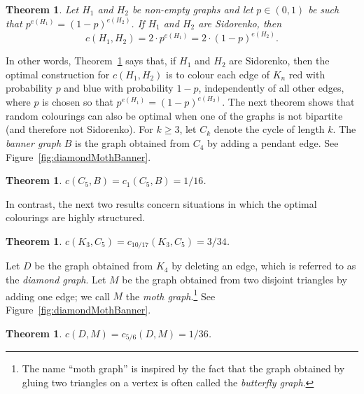 \documentclass[12pt]{article}
\numberwithin{equation}{section}
\newtheorem{thm}[equation]{Theorem}
\theoremstyle{definition}
\theoremstyle{remark}
\begin{document}
\begin{thm}
\label{th:Sidorenko}
Let $H_1$ and $H_2$ be non-empty graphs and let $p\in(0,1)$ be such that $p^{e(H_1)}=(1-p)^{e(H_2)}$. If $H_1$ and $H_2$ are Sidorenko, then
\[c(H_1,H_2)=2\cdot p^{e(H_1)}=2\cdot (1-p)^{e(H_2)}.\]
\end{thm}

In other words, Theorem~\ref{th:Sidorenko} says that, if $H_1$ and $H_2$ are Sidorenko, then the optimal construction for $c(H_1,H_2)$ is to colour each edge of $K_n$ red with probability $p$ and blue with probability $1-p$, independently of all other edges, where $p$ is chosen so that $p^{e(H_1)}=(1-p)^{e(H_2)}$. The next theorem shows that random colourings can also be optimal when one of the graphs is not bipartite (and therefore not Sidorenko). For $k\geq3$, let $C_k$ denote the cycle of length $k$. The \emph{banner graph} $B$ is the graph obtained from $C_4$ by adding a pendant edge. See Figure~\ref{fig:diamondMothBanner}.

\begin{thm}
\label{th:C5,B}
$c(C_5,B)=c_{1}(C_5,B)=1/16$.
\end{thm}



In contrast, the next two results concern situations in which the optimal colourings are highly structured. 

\begin{thm}
\label{th:K3,C5}
$c(K_3,C_5)=c_{10/17}(K_3,C_5)=3/34$.
\end{thm}

Let $D$ be the graph obtained from $K_4$ by deleting an edge, which is referred to as the \emph{diamond graph}. Let $M$ be the graph obtained from two disjoint triangles by adding one edge; we call $M$ the \emph{moth graph}.\footnote{The name ``moth graph'' is inspired by the fact that the graph obtained by gluing two triangles on a vertex is often called the \emph{butterfly graph}.} See Figure~\ref{fig:diamondMothBanner}.

\begin{thm}
\label{th:D,M}
$c(D,M)=c_{5/6}(D,M)=1/36$. 
\end{thm}
\end{document}
